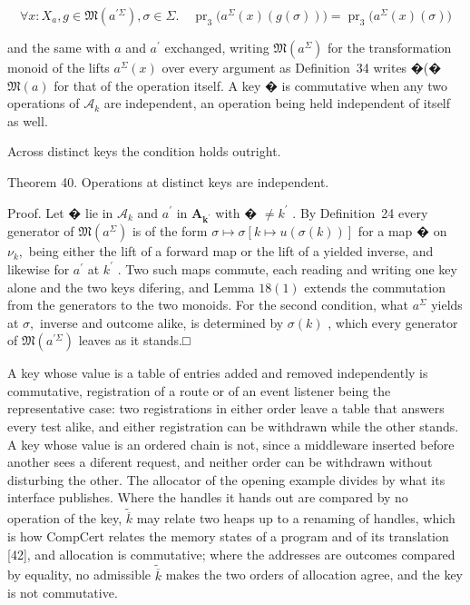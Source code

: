 \documentclass[
  10
]{article}
\begin{document}
\[
\forall x : X _ { a } , g \in \mathfrak { M } ( a ^ { \prime \Sigma } ) , \sigma \in \Sigma . \quad \operatorname { p r } _ { 3 } \big ( a ^ { \Sigma } ( x ) ( g ( \sigma ) ) \big ) = \operatorname { p r } _ { 3 } \big ( a ^ { \Sigma } ( x ) ( \sigma ) \big )\tag{35}
\]

and the same with \(a\) and \(a ^ { \prime }\) exchanged, writing
\({ \mathfrak { M } } ( a ^ { \Sigma } )\) for the transformation monoid
of the lifts \(a ^ { \Sigma } ( x )\) over every argument as
Definition~34 writes �(� \({ \mathfrak { M } } ( a )\) for that of the
operation itself. A key � is commutative when any two operations of
\(\mathcal { A } _ { k }\) are independent, an operation being held
independent of itself as well.

Across distinct keys the condition holds outright.

Theorem 40. Operations at distinct keys are independent.

Proof. Let � lie in \(\mathcal { A } _ { k }\) and \(a ^ { \prime }\) in
\(\boldsymbol { A } _ { \boldsymbol { k } ^ { \prime } }\) with �
\(\neq k ^ { \prime }\) . By Definition~24 every generator of
\({ \mathfrak { M } } ( a ^ { \Sigma } )\) is of the form
\(\sigma \mapsto \sigma [ k \mapsto u ( \sigma ( k ) ) ]\) for a map �
on \(\nu _ { k } ,\) being either the lift of a forward map or the lift
of a yielded inverse, and likewise for \(a ^ { \prime }\) at
\(k ^ { \prime }\) . Two such maps commute, each reading and writing one
key alone and the two keys difering, and Lemma \(1 8 ( 1 )\) extends the
commutation from the generators to the two monoids. For the second
condition, what \(a ^ { \Sigma }\) yields at \(\sigma ,\) inverse and
outcome alike, is determined by \(\sigma ( k )\) , which every generator
of \({ \mathfrak { M } } ( a ^ { \prime \Sigma } )\) leaves as it
stands.□

A key whose value is a table of entries added and removed independently
is commutative, registration of a route or of an event listener being
the representative case: two registrations in either order leave a table
that answers every test alike, and either registration can be withdrawn
while the other stands. A key whose value is an ordered chain is not,
since a middleware inserted before another sees a diferent request, and
neither order can be withdrawn without disturbing the other. The
allocator of the opening example divides by what its interface
publishes. Where the handles it hands out are compared by no operation
of the key, \(\widetilde { \overline { { k } } }\) may relate two heaps
up to a renaming of handles, which is how CompCert relates the memory
states of a program and of its translation {[}42{]}, and allocation is
commutative; where the addresses are outcomes compared by equality, no
admissible \(\widetilde { \overline { { k } } }\) makes the two orders
of allocation agree, and the key is not commutative.
\end{document}
